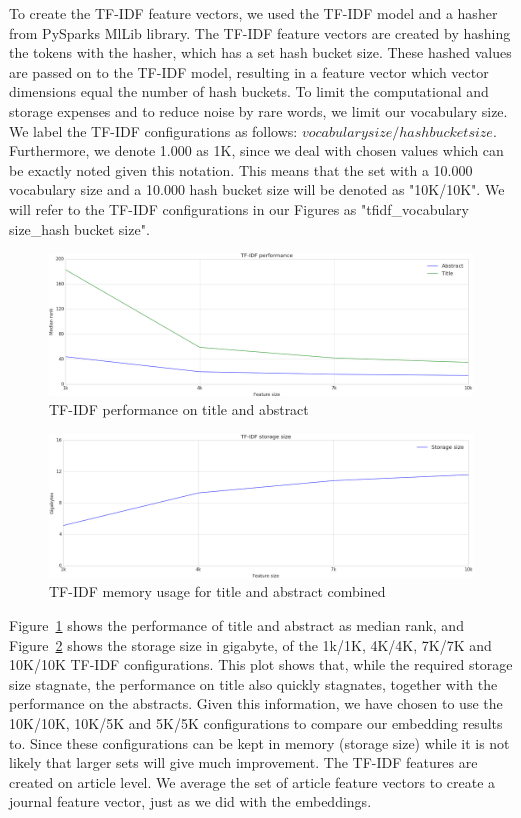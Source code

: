 \documentclass[../../Thesis.tex]{subfiles}
\begin{document}
\clearpage
{}
To create the TF-IDF feature vectors, we used the TF-IDF model and a hasher from PySparks MlLib library. The TF-IDF feature vectors are created by hashing the tokens with the hasher, which has a set hash bucket size. These hashed values are passed on to the TF-IDF model, resulting in a feature vector which vector dimensions equal the number of hash buckets. To limit the computational and storage expenses and to reduce noise by rare words, we limit our vocabulary size.
We label the TF-IDF configurations as follows: $vocabulary size/hash bucket size$. Furthermore, we denote 1.000 as 1K, since we deal with chosen values which can be exactly noted given this notation. This means that the set with a 10.000 vocabulary size and a 10.000 hash bucket size will be denoted as "10K/10K". We will refer to the TF-IDF configurations in our Figures as "tfidf\_vocabulary size\_hash bucket size".
\begin{figure}[hbt]
\includegraphics[width=5in]{Plots/tfidf_selection_plot_performance}
\caption{TF-IDF performance on title and abstract}\label{figure:tfidfPerformance}
\end{figure}
\begin{figure}[hbt]
\includegraphics[width=5in]{Plots/tfidf_selection_plot_memory}
\caption{TF-IDF memory usage for title and abstract combined}\label{figure:tfidfMemory}
\end{figure}
\FloatBarrier
Figure~\ref{figure:tfidfPerformance} shows the performance of title and abstract as median rank, and Figure~\ref{figure:tfidfMemory} shows the storage size in gigabyte, of the 1k/1K, 4K/4K, 7K/7K and 10K/10K TF-IDF configurations. This plot shows that, while the required storage size stagnate, the performance on title also quickly stagnates, together with the performance on the abstracts. Given this information, we have chosen to use the 10K/10K, 10K/5K and 5K/5K configurations to compare our embedding results to. Since these configurations can be kept in memory (storage size) while it is not likely that larger sets will give much improvement. The TF-IDF features are created on article level. We average the set of article feature vectors to create a journal feature vector, just as we did with the embeddings. 
\end{document}
